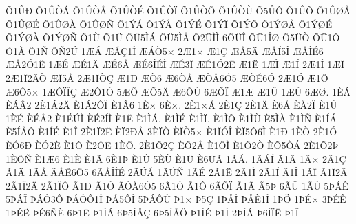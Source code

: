 {^^d51^^db^^d0
^^d51^^db^^d2^^c1
^^d51^^db^^d2^^c5
^^d51^^db^^d2^^c9
^^d51^^db^^d2^^cf
^^d51^^db^^d2^^d5
^^d51^^db^^d2^^d9
^^d55^^db^^d4
^^d51^^db^^d5
^^d51^^db^^d8^^c5
^^d51^^db^^d8^^c9
^^d51^^db^^d8^^c0
^^d51^^db^^d8^^d1
^^d51^^dd^^c1
^^d51^^dd^^c5
^^d51^^dd^^c9
^^d51^^dd^^cf
^^d51^^dd^^d5
^^d51^^dd^^d8^^c5
^^d51^^dd^^d8^^c9
^^d51^^dd^^d8^^c0
^^d51^^dd^^d8^^d1
^^d51^^d9
^^d51^^dc
^^d5^^dc5^^cc^^c1
^^d5^^dc5^^cc^^c5
^^d52^^dc^^cc^^cc
6^^d5^^dc^^ce
^^d5^^dc1^^ce^^d8
^^d55^^dc^^d2
^^d5^^dc1^^d4
^^d51^^c0
^^d51^^d1
^^d5^^d12^^da
1^^c6^^c1
^^c6^^c1^^c71^^ce
^^c6^^c1^^d25^^d7
2^^c61^^d7
^^c61^^c7
^^c6^^c55^^c4
^^c6^^c5^^cd5^^ce
^^c6^^c5^^ce^^c96
^^c6^^c52^^d31^^cb
1^^c6^^c9
^^c6^^c91^^c4
^^c6^^c96^^c5
^^c6^^c96^^ce^^c9^^ce
^^c6^^c93^^cf
^^c6^^c91^^d32^^cb
^^c61^^cb
1^^c6^^cc
^^c61^^cd
2^^c61^^ce
1^^c6^^cf
2^^c61^^cf2^^c2^^d2
^^c6^^cf5^^c5
2^^c61^^cf^^d2^^c7
^^c61^^d0
^^c6^^d26
^^c66^^d2^^c5
^^c6^^d2^^c56^^d35
^^c6^^d2^^c96^^d3
2^^c61^^d3
^^c61^^d4
^^c66^^d45^^d7
1^^c6^^d4^^cf^^ce^^c7
^^c62^^d41^^d2
5^^c6^^d5
^^c6^^d55^^c4
^^c66^^d5^^da
6^^c6^^d5^^cf
^^c61^^c6
^^c61^^db
1^^c6^^d9
6^^c6^^d8.
1^^c8^^c1
^^c8^^c1^^c22
2^^c81^^c12^^c4
^^c81^^c12^^d4^^cf
^^c81^^c26
1^^c8^^d7
6^^c8^^d7.
2^^c81^^d7^^c5
2^^c81^^c7
2^^c81^^c4
^^c86^^c5
^^c8^^c52^^cf
^^c81^^da
1^^c8^^c9
^^c8^^c9^^c52
^^c81^^c9^^da^^cc
^^c8^^c92^^cd^^cc
^^c81^^cb
^^c81^^cc^^c1.
^^c81^^cc^^c9
^^c81^^cc^^cf.
^^c81^^cc^^d5
^^c81^^cc^^d9
^^c85^^cc^^c0
^^c81^^cc^^d1
^^c81^^cd^^c1
^^c85^^cd^^c5^^d4
^^c81^^cd^^c9
^^c81^^ce
2^^c81^^cf2^^cb
^^c8^^cf2^^d0^^c5
3^^c8^^cf^^d2
^^c8^^cf^^d25^^d7
^^c81^^cf^^d3^^ce
^^c8^^cf5^^d46^^cc
^^c81^^d0
1^^c8^^d2
2^^c81^^d3
^^c8^^d36^^d0
^^c8^^d32^^c8
^^c81^^d4
^^c82^^d4^^cb
1^^c8^^d5.
2^^c81^^d52^^c7
^^c8^^d52^^c5
^^c81^^d5^^cc
^^c81^^d52^^d2
^^c8^^d55^^d2^^c1
2^^c81^^d52^^de
1^^c8^^d5^^d1
^^c81^^c66
^^c81^^c8
^^c81^^c3
6^^c81^^de
^^c81^^db
5^^c8^^d9
^^c81^^dc
^^c86^^dc^^c3
1^^c3^^c1.
1^^c3^^c1^^cd
^^c31^^c2
1^^c3^^d7
2^^c31^^c7
^^c31^^c4
1^^c3^^c5
^^c3^^c5^^ca6^^d45
6^^c3^^c5^^ce^^ce^^c9
2^^c3^^da^^c1
1^^c3^^da^^d1
1^^c3^^c9
2^^c31^^cb
2^^c31^^cc
2^^c31^^cd
^^c31^^ce
1^^c3^^cf
^^c31^^cf2^^c2
2^^c31^^cf2^^c4
2^^c31^^cf^^d4
^^c31^^d0
^^c31^^d2
^^c3^^d2^^c56^^d35
6^^c31^^d3
^^c31^^d4
6^^c3^^d5^^cf
^^c31^^c3
^^c35^^de
6^^c3^^db
1^^c3^^d9
5^^de^^c1^^ca
5^^de^^c1^^ce
^^de^^c1^^d23^^d4
^^de^^c1^^d3^^d41^^cc
^^de^^c15^^d4^^cc
5^^de^^c1^^d4^^d9
^^de1^^d7
^^de5^^c7
1^^de^^c5^^cc
^^de^^c5^^c81^^cc
1^^de^^d6
1^^de^^c9^^d7
3^^de^^c9^^ca
1^^de^^c9^^cb
^^de^^c96^^d1^^c8
6^^de1^^cb
^^de1^^cc^^c1
6^^de5^^cc^^c5^^c7
6^^de5^^cc^^c5^^d6
^^de1^^cc^^c9
^^de1^^cd
2^^de^^cd^^c1
^^de6^^cd^^cf^^cb
^^de1^^ce
}
